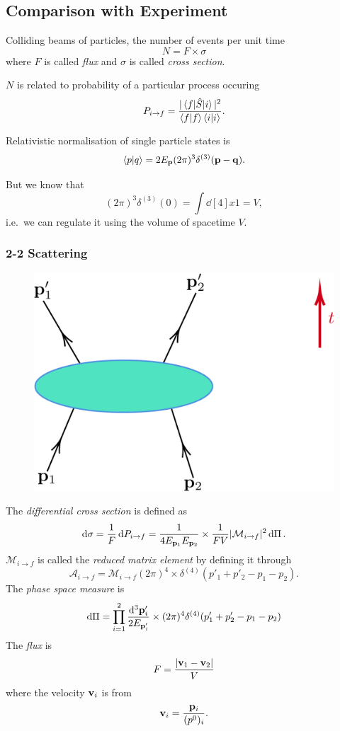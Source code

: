 \documentclass[a4paper,11pt]{article}
\begin{document}
	\subsection{Comparison with Experiment}
	Colliding beams of particles, the number of events per unit time
	\[
		N = F \times \sigma
	\]
	where $F$ is called \emph{flux} and $\sigma$ is called \emph{cross section}.

	$N$ is related to probability of a particular process occuring
	\[
		P _{i \to f} = \frac{|\mel{f}{\hat S}{i}|^2}{\braket{f}{f} \braket{i}{i}}.
	\]
	
	Relativistic normalisation of single particle states is
	\[
		\braket{p}{q} = 2 E _{\vb p} (2 \pi)^3 \delta ^{(3)}(\vb p - \vb q).
	\]

	But we know that 
	\[
		(2 \pi)^3 \delta ^{(3)}(0) = \int \dd[4]{x} 1 = V,
	\]
	i.e.\ we can regulate it using the volume of spacetime $V$. 

	\subsubsection{2-2 Scattering}
	
	\begin{figure}[H]
		\centering
		\includegraphics[width=0.45\linewidth]{fig/2-2-scattering.pdf}
	\end{figure}

	The \emph{differential cross section} is defined as 
	\[
		\dd{\sigma} = \frac{1}{F} \dd{P _{i \to f}} = \frac{1}{4 E _{\vb p_1} E _{\vb p_2}} \times \frac{1}{F V} |\mathcal{M} _{i \to f}|^2 \dd{\Pi}.
	\]
	$\mathcal{M}_{i \to f}$ is called the \emph{reduced matrix element} by defining it through
	\[
		\mathcal{A}_{i \to f} = \mathcal{M}_{i \to f} (2 \pi)^4 \times \delta ^{(4)}(p'_1 + p'_2 - p_1 - p_2).
	\]
	The \emph{phase space measure} is 
	\[
		\dd{\Pi} = \prod _{i = 1}^{2} \frac{\dd[3]{\vb p'_i}}{2 E _{\vb p'_i}} \times (2 \pi)^4 \delta ^{(4)}(p'_1 + p'_2 - p_1 - p_2)
	\]
	The \emph{flux} is
	\[
		F = \frac{\abs{\vb v_1 - \vb v_2}}{V}
	\]
	where the velocity $\vb v_i$ is from
	\[
		\vb v_i = \frac{\vb p_i}{(p^0)_i}.
	\]
	
\end{document}
